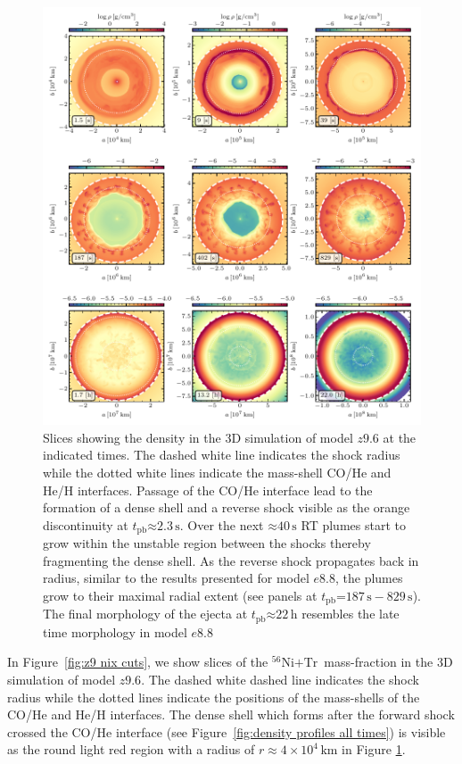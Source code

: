 \documentclass[fleqn,usenatbib]{mnras}
\newcommand{\tpb}{\ensuremath{t_{\text{pb}}}}
\newcommand{\nickel}{\ensuremath{\mathrm{^{56}Ni}}\xspace}
\newcommand{\tracer}{\ensuremath{\mathrm{Tr}}\xspace}
\newcommand{\s}{\ensuremath{\text{s}}}
\begin{document}
\begin{figure}%
\includegraphics[width=\textwidth]{pic/z9_3d_3x3_den.pdf}
    \caption{Slices showing the density in the 3D simulation of model $z9.6$ 
        at the indicated times. 
    The dashed white line indicates the shock radius while the dotted white 
    lines indicate the mass-shell CO/He and He/H interfaces.
    Passage of the CO/He interface lead to the formation of a dense shell 
    and a reverse shock
    visible as the orange discontinuity at $\tpb\mathord{\approx}2.3\,\s$. Over the 
    next $\mathord{\approx}40\,\s$ RT plumes
    start to grow within the unstable region between the shocks thereby fragmenting
    the dense shell.
    As the reverse shock propagates back in radius, similar to the 
    results presented for model $e8.8$, the plumes
    grow to their maximal radial extent 
    (see panels at $\tpb\mathord{=}187\,\s-829\,\s$).
    The final morphology of the ejecta at $\tpb\mathord{\approx}22\,\mathrm{h}$ resembles 
    the late time morphology in model $e8.8$}
\label{fig:z9 rho cuts}
\end{figure}%

In Figure~\ref{fig:z9 nix cuts}, we show slices of the $\nickel\mathord{+}\tracer\,$  mass-fraction in the 3D simulation of model $z9.6$. 
The dashed white dashed line indicates the shock radius while the dotted lines indicate the positions of 
the mass-shells of the CO/He and He/H interfaces.
The dense shell which forms after the forward shock crossed 
the CO/He interface (see Figure~\ref{fig:density profiles all times}) 
is visible as the round light red region with a radius of $r\mathrm{\approx} 4\times 10^4\,\mathrm{km}$ 
in Figure \ref{fig:z9 rho cuts}.  
\end{document}
